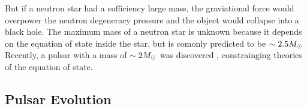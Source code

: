 But if a neutron star had a sufficiency large mass, the graviational
force would overpower the neutron degeneracy pressure and the
object would collapse into a black hole. The maximum mass of a
neutron star is unknown because it depends on the equation of state
inside the star, but is comonly predicted to be $\sim 2.5M_{\odot}$
Recently, a pulsar with a mass of $\sim 2M_{\odot}$ was discovered
\citep{demorest_2010_two-solar-mass-neutron}, constrainging
theories of the equation of state.




\subsection{Pulsar Evolution}









